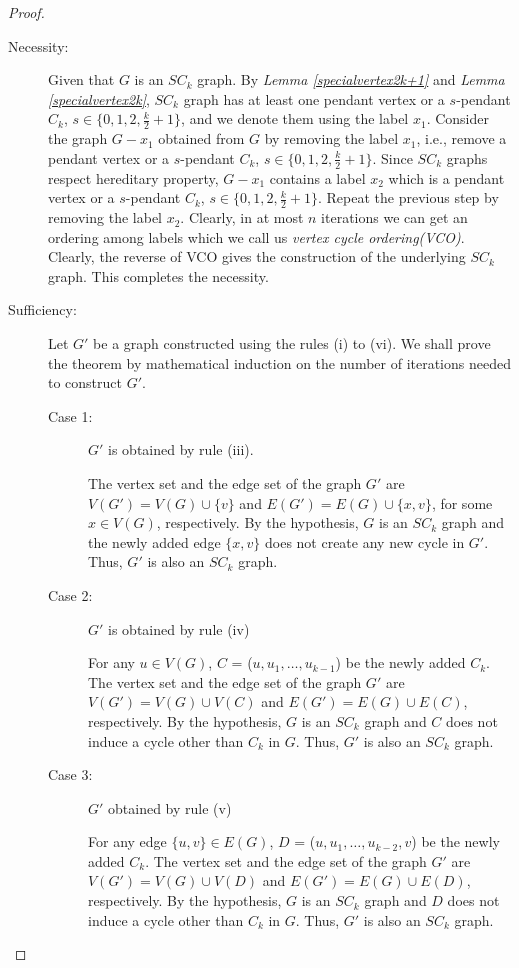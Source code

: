 \documentclass[runningheads]{llncs}
\begin{document}
\begin{proof}
\begin{description}

\item[{Necessity:}] Given that $G$ is an $SC_k$ graph. By \emph{Lemma \ref{specialvertex2k+1}} and \emph{Lemma \ref{specialvertex2k}}, $SC_k$ graph has at least one pendant vertex or a $s$-pendant $C_k$, $s \in\{0,1,2,\frac{k}{2}+1\}$, and we denote them using the label $x_1$. Consider the graph $G-x_1$ obtained from $G$ by removing the label $x_1$, i.e., remove a pendant vertex or a $s$-pendant $C_k$, $s \in\{0,1,2,\frac{k}{2}+1\}$. Since $SC_k$ graphs respect hereditary property, $G-x_1$ contains a label $x_2$ which is a pendant vertex or a $s$-pendant $C_k$, $s \in\{0,1,2,\frac{k}{2}+1\}$. Repeat the previous step by removing the label $x_2$. Clearly, in at most $n$ iterations we can get an ordering among labels which we call us \emph{vertex cycle ordering(VCO)}. Clearly, the reverse of VCO gives the construction of the underlying $SC_k$ graph. This completes the necessity.
\item[{Sufficiency:}] Let $G'$ be a graph constructed using the rules (i) to (vi). We shall prove the theorem by mathematical induction on the number of iterations needed to construct $G'$.
\begin{description}
\item[Case 1:] $G'$ is obtained by rule (iii).
 
The vertex set and the edge set of the graph $G'$ are $V(G')=V(G) \cup \{v\}$ and $E(G')=E(G) \cup \{x,v\}$, for some $x \in V(G)$, respectively. By the hypothesis, $G$ is an $SC_k$ graph and the newly added edge $\{x, v\}$ does not create any new cycle in $G'$. Thus, $G'$ is also an $SC_k$ graph.

\item[Case 2:] $G'$ is obtained by rule (iv)

For any $u \in V(G)$, $C$ = ($u, u_1, \ldots, u_{k-1}$) be the newly added $C_k$. The vertex set and the edge set of the graph $G'$ are $V(G')=V(G) \cup V(C)$ and $E(G')=E(G) \cup E(C)$, respectively. By the hypothesis, $G$ is an $SC_k$ graph and $C$ does not induce a cycle other than $C_k$ in $G$. Thus, $G'$ is also an $SC_k$ graph.

\item[Case 3:] $G'$ obtained by rule (v)

For any edge $\{u, v\} \in E(G)$, $D$ = ($u, u_1, \ldots, u_{k-2}, v$) be the newly added $C_k$. The vertex set and the edge set of the graph $G'$ are $V(G')=V(G) \cup V(D)$ and $E(G')=E(G) \cup E(D)$, respectively. By the hypothesis, $G$ is an $SC_k$ graph and $D$ does not induce a cycle other than $C_k$ in $G$. Thus, $G'$ is also an $SC_k$ graph.



\end{description}
\end{description}
\end{proof}
\end{document}
